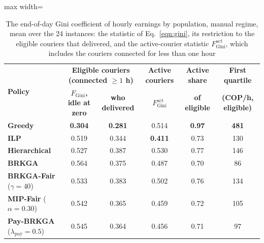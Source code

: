 \documentclass[a4paper,11pt,review,3p,authoryear]{elsarticle}
\newcommand{\FG}{F_{\text{Gini}}}
\newcommand{\FGa}{F_{\text{Gini}}^{\text{act}}}
\begin{document}
\begin{table}[htbp]
\centering
\begin{adjustbox}{max width=\textwidth}
\begin{tabular}{l|cc|c|c|c}
\hline
\multirow{2}{*}{\textbf{Policy}} & \multicolumn{2}{c|}{\textbf{Eligible couriers (connected $\ge 1$ h)}} & \textbf{Active couriers} & \textbf{Active share} & \textbf{First quartile} \\
 & $\FG$\textbf{, idle at zero} & \textbf{who delivered} & $\FGa$ & \textbf{of eligible} & \textbf{(COP/h, eligible)} \\
\hline
\textbf{Greedy} & \textbf{0.304} & \textbf{0.281} & 0.514 & \textbf{0.97} & \textbf{481} \\
\textbf{ILP} & 0.519 & 0.344 & \textbf{0.411} & 0.73 & 130 \\
\textbf{Hierarchical} & 0.527 & 0.387 & 0.530 & 0.77 & 146 \\
\textbf{BRKGA} & 0.564 & 0.375 & 0.487 & 0.70 & 86 \\
\hline
\textbf{BRKGA-Fair} ($\gamma = 40$) & 0.533 & 0.383 & 0.502 & 0.76 & 134 \\
\textbf{MIP-Fair} ($\alpha = 0.30$) & 0.542 & 0.365 & 0.459 & 0.72 & 105 \\
\textbf{Pay-BRKGA} ($\lambda_{\text{pay}} = 0.5$) & 0.545 & 0.364 & 0.456 & 0.71 & 97 \\
\hline
\end{tabular}
\end{adjustbox}
\caption{The end-of-day Gini coefficient of hourly earnings by population, manual regime, mean over the 24 instances: the statistic of Eq.~\eqref{eqn:gini}, its restriction to the eligible couriers that delivered, and the active-courier statistic $\FGa$, which includes the couriers connected for less than one hour}
\label{tab:scope}
\end{table}
\end{document}
